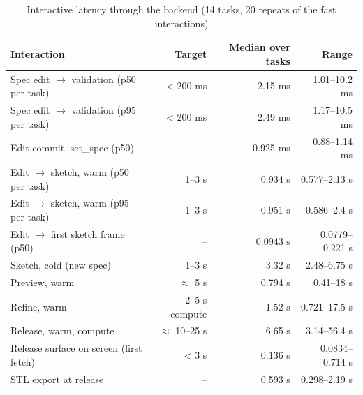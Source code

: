 \begin{table}[t]
\centering\small
\caption{Interactive latency through the backend (14 tasks, 20 repeats of the fast interactions)}
\label{tab:t11_x6a_latency}
\begin{tabular}{lrrr}
\toprule
Interaction & Target & Median over tasks & Range \\
\midrule
Spec edit $\rightarrow$ validation (p50 per task) & < 200 ms & 2.15 ms & 1.01--10.2 ms \\
Spec edit $\rightarrow$ validation (p95 per task) & < 200 ms & 2.49 ms & 1.17--10.5 ms \\
Edit commit, set\_spec (p50) & -- & 0.925 ms & 0.88--1.14 ms \\
Edit $\rightarrow$ sketch, warm (p50 per task) & 1--3 s & 0.934 s & 0.577--2.13 s \\
Edit $\rightarrow$ sketch, warm (p95 per task) & 1--3 s & 0.951 s & 0.586--2.4 s \\
Edit $\rightarrow$ first sketch frame (p50) & -- & 0.0943 s & 0.0779--0.221 s \\
Sketch, cold (new spec) & 1--3 s & 3.32 s & 2.48--6.75 s \\
Preview, warm & $\approx$ 5 s & 0.794 s & 0.41--18 s \\
Refine, warm & 2--5 s compute & 1.52 s & 0.721--17.5 s \\
Release, warm, compute & $\approx$ 10--25 s & 6.65 s & 3.14--56.4 s \\
Release surface on screen (first fetch) & < 3 s & 0.136 s & 0.0834--0.714 s \\
STL export at release & -- & 0.593 s & 0.298--2.19 s \\
\bottomrule
\end{tabular}
\end{table}
